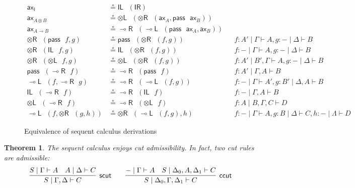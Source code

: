 \documentclass[submission,copyright,creativecommons]{eptcs}
\newtheorem{theorem}{Theorem}[section]
\theoremstyle{definition}
\newcommand{\tl}{\otimes \mathsf{L}}
\newcommand{\tr}{\otimes \mathsf{R}}
\newcommand{\lright}{{\multimap}\mathsf{R}}
\newcommand{\lleft}{{\multimap}\mathsf{L}}
\newcommand{\pass}{\mathsf{pass}}
\newcommand{\unitl}{\mathsf{IL}}
\newcommand{\unitr}{\mathsf{IR}}
\newcommand{\ax}{\mathsf{ax}}
\newcommand{\ot}{\otimes}
\newcommand{\lolli}{\multimap}
\newcommand{\I}{\mathsf{I}}
\newcommand{\niccolo}[1]{{\color{red}\textbf{Niccol{\`o}: }#1}}
\begin{document}
\begin{figure}[t!]
\begin{align*}
  \ax_{\I} &\circeq \unitl \text{ } (\unitr)
  \\
  \ax_{A \ot B} &\circeq \tl \text{ } (\tr \text{ } (\ax_{A} , \pass \text{ } \ax_{B}))
  \\
  \ax_{A \lolli B} &\circeq \lright \text{ } (\lleft \text{ } (\pass \text{ } \ax_{A}, \ax_{B} ))
  \\
  \tr \text{ } (\pass \text{ } f, g) &\circeq \pass \text{ } (\tr \text{ } (f, g)) &&f : A' \mid \Gamma \vdash A, g : - \mid \Delta \vdash B
  \\
  \tr \text{ } (\unitl \text{ } f, g) &\circeq \unitl \text{ } (\tr \text{ } (f , g)) &&f : - \mid \Gamma \vdash A , g : - \mid \Delta \vdash B
  \\
  \tr \text{ } (\tl \text{ } f, g) &\circeq \tl \text{ } (\tr \text{ } (f , g)) &&f : A' \mid B' , \Gamma \vdash A , g : - \mid \Delta \vdash B
  \\
  \pass \text{ } (\lright \text{ } f) &\circeq \lright \text{ } (\pass \text{ } f) &&f : A' \mid \Gamma , A \vdash B
  \\
  \lleft \text{ } (f, \lright \text{ } g) &\circeq \lright \text{ } (\lleft \text{ } (f, g)) &&f : - \mid \Gamma \vdash A', g : B' \mid \Delta , A \vdash B
  \\
  \unitl \text{ } (\lright \text{ } f) &\circeq \lright \text{ } (\unitl \text{ } f) &&f : - \mid \Gamma , A \vdash B
  \\
  \tl \text{ } (\lright \text{ } f) &\circeq \lright \text{ } (\tl \text{ } f) &&f : A \mid B , \Gamma , C \vdash D
  \\
  \lleft \text{ } (f, \tr \text{ } (g, h)) &\circeq \tr \text{ } (\lleft \text{ } (f , g), h) &&f: - \mid \Gamma \vdash A, g : B \mid \Delta \vdash C, h : - \mid \Lambda \vdash D
\end{align*}
\caption{Equivalence of sequent calculus derivations}
\label{fig:circeq}
\end{figure}
\begin{theorem}
The sequent calculus enjoys cut admissibility. In fact, two cut rules are admissible:
  \begin{displaymath}
    \infer[\mathsf{scut}]{S \mid \Gamma , \Delta \vdash C}{
      S \mid \Gamma \vdash A
      &
      A \mid \Delta \vdash C
    }
    \qquad
    \infer[\mathsf{ccut}]{S \mid \Delta_0 , \Gamma , \Delta_1 \vdash C}{
      - \mid \Gamma \vdash A
      &
      S \mid \Delta_0 , A , \Delta_1 \vdash C
    }
  \end{displaymath}
\end{theorem}
\end{document}
